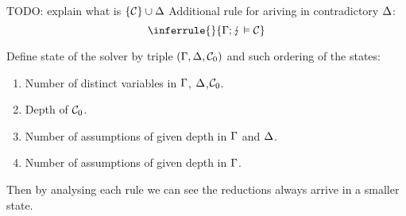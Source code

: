 \documentclass[english, mgr]{iithesis}
\begin{document}
TODO: explain what is $\{\mathcal{C}\} \cup \Delta$
Additional rule for ariving in contradictory $\Delta$:
$$
\inferrule{
}{
  \cEnv ; \lightning \vDash \sconstr
}
$$


Define state of the solver by triple $(\Gamma, \Delta, \mathcal{C}_0)$ and such
ordering of the states:
\begin{enumerate}
  \item Number of distinct variables in $\Gamma$, $\Delta$,$ \mathcal{C}_0$.
  \item Depth of $\mathcal{C}_0$.
  \item Number of assumptions of given depth in $\Gamma$ and $\Delta$.
  \item Number of assumptions of given depth in $\Gamma$.
\end{enumerate}

Then by analysing each rule we can see the reductions always arrive in a smaller
state.
\end{document}
